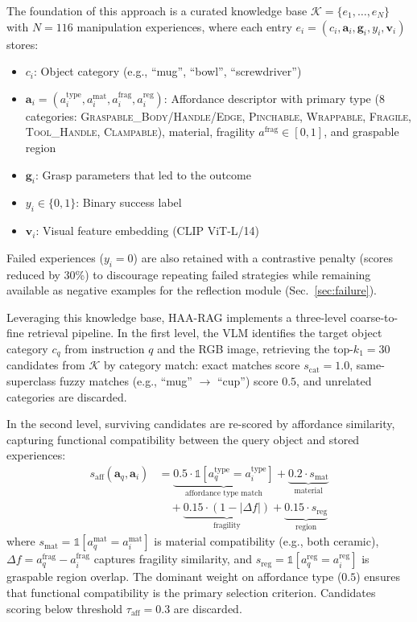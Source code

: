 \documentclass[letterpaper, 10pt, conference]{ieeeconf}
\newcommand{\haarag}{HAA-RAG}
\begin{document}
The foundation of this approach is a curated knowledge base $\mathcal{K} = \{e_1, \dots, e_N\}$ with $N = 116$ manipulation experiences, where each entry $e_i = (c_i, \mathbf{a}_i, \mathbf{g}_i, y_i, \mathbf{v}_i)$ stores:
\begin{itemize}
    \item $c_i$: Object category (e.g., ``mug'', ``bowl'', ``screwdriver'')
    \item $\mathbf{a}_i = (a^{\mathrm{type}}_i, a^{\mathrm{mat}}_i, a^{\mathrm{frag}}_i, a^{\mathrm{reg}}_i)$: Affordance descriptor with primary type (8 categories: \textsc{Graspable\_Body\slash Handle\slash Edge}, \textsc{Pinchable}, \textsc{Wrappable}, \textsc{Fragile}, \textsc{Tool\_Handle}, \textsc{Clampable}), material, fragility $a^{\mathrm{frag}} \in [0,1]$, and graspable region
    \item $\mathbf{g}_i$: Grasp parameters that led to the outcome
    \item $y_i \in \{0, 1\}$: Binary success label
    \item $\mathbf{v}_i$: Visual feature embedding (CLIP ViT-L/14)
\end{itemize}

Failed experiences ($y_i = 0$) are also retained with a contrastive penalty (scores reduced by 30\%) to discourage repeating failed strategies while remaining available as negative examples for the reflection module (Sec.~\ref{sec:failure}).

Leveraging this knowledge base, \haarag{} implements a three-level coarse-to-fine retrieval pipeline.
In the first level, the VLM identifies the target object category $c_q$ from instruction $q$ and the RGB image, retrieving the top-$k_1 = 30$ candidates from $\mathcal{K}$ by category match: exact matches score $s_{\mathrm{cat}} = 1.0$, same-superclass fuzzy matches (e.g., ``mug'' $\to$ ``cup'') score $0.5$, and unrelated categories are discarded.

In the second level, surviving candidates are re-scored by affordance similarity, capturing functional compatibility between the query object and stored experiences:
\begin{equation}
\begin{split}
    s_{\mathrm{aff}}(\mathbf{a}_q, \mathbf{a}_i) &= \underbrace{0.5 \cdot \mathbb{1}[a_q^{\mathrm{type}} = a_i^{\mathrm{type}}]}_{\text{affordance type match}} + \underbrace{0.2 \cdot s_{\mathrm{mat}}}_{\text{material}} \\
    &\quad + \underbrace{0.15 \cdot (1 - |\Delta f|)}_{\text{fragility}} + \underbrace{0.15 \cdot s_{\mathrm{reg}}}_{\text{region}}
\end{split}
    \label{eq:affordance_sim}
\end{equation}
where $s_{\mathrm{mat}} = \mathbb{1}[a_q^{\mathrm{mat}} = a_i^{\mathrm{mat}}]$ is material compatibility (e.g., both ceramic), $\Delta f = a_q^{\mathrm{frag}} - a_i^{\mathrm{frag}}$ captures fragility similarity, and $s_{\mathrm{reg}} = \mathbb{1}[a_q^{\mathrm{reg}} = a_i^{\mathrm{reg}}]$ is graspable region overlap.
The dominant weight on affordance type ($0.5$) ensures that functional compatibility is the primary selection criterion.
Candidates scoring below threshold $\tau_{\mathrm{aff}} = 0.3$ are discarded.
\end{document}
